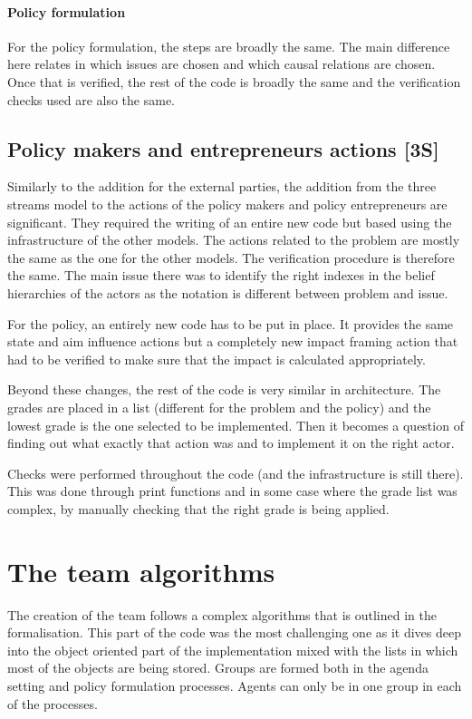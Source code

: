 %
\paragraph{Policy formulation}

For the policy formulation, the steps are broadly the same. The main difference here relates in which issues are chosen and which causal relations are chosen. Once that is verified, the rest of the code is broadly the same and the verification checks used are also the same.

\subsection{Policy makers and entrepreneurs actions [3S]}

Similarly to the addition for the external parties, the addition from the three streams model to the actions of the policy makers and policy entrepreneurs are significant. They required the writing of an entire new code but based using the infrastructure of the other models. The actions related to the problem are mostly the same as the one for the other models. The verification procedure is therefore the same. The main issue there was to identify the right indexes in the belief hierarchies of the actors as the notation is different between problem and issue.

For the policy, an entirely new code has to be put in place. It provides the same state and aim influence actions but a completely new impact framing action that had to be verified to make sure that the impact is calculated appropriately.

Beyond these changes, the rest of the code is very similar in architecture. The grades are placed in a list (different for the problem and the policy) and the lowest grade is the one selected to be implemented. Then it becomes a question of finding out what exactly that action was and to implement it on the right actor.

Checks were performed throughout the code (and the infrastructure is still there). This was done through print functions and in some case where the grade list was complex, by manually checking that the right grade is being applied. 

\section{The team algorithms}

The creation of the team follows a complex algorithms that is outlined in the formalisation. This part of the code was the most challenging one as it dives deep into the object oriented part of the implementation mixed with the lists in which most of the objects are being stored. Groups are formed both in the agenda setting and policy formulation processes. Agents can only be in one group in each of the processes.

